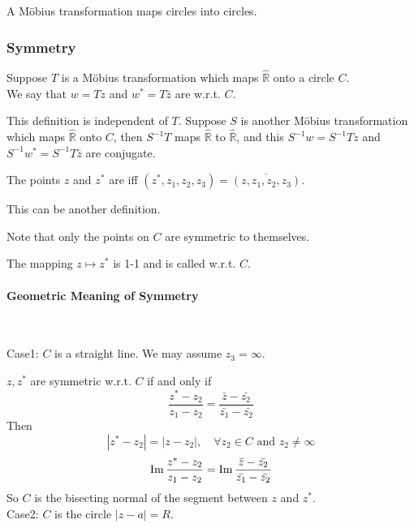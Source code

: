 
\begin{theorem}
    A M{\"o}bius transformation maps circles into circles.
\end{theorem}
\subsubsection{Symmetry}
Suppose  $ T  $ is a M{\"o}bius transformation which maps  $ \hat{\mathbb{R}}  $ onto a circle  $ C $. \\
We say that  $ w=Tz  $ and  $ w^*=T\bar{z} $ are  w.r.t.  $ C $.
\begin{remark}
    This definition is independent of  $ T $. Suppose  $ S  $ is another M{\"o}bius transformation which maps  $ \hat{\mathbb{R}} $ onto  $ C $, then  $ S^{-1}T $ maps  $ \hat{\mathbb{R}} $ to  $ \hat{\mathbb{R}} $, and this  $ S^{-1}w=S^{-1}Tz $ and  $ S^{-1}w^*=S^{-1}T\bar{z} $ are conjugate.       
\end{remark}  
The points  $ z  $ and  $ z^* $ are  iff  $ (z^*,z_1,z_2,z_3)=\overline{(z,z_1,z_2,z_3)} $.

This can be another definition. 

Note that only the points on  $ C  $ are symmetric to themselves.

The mapping  $ z\mapsto z^* $ is 1-1 and is called  w.r.t. $ C $.

\paragraph{Geometric Meaning of Symmetry} 
\,

Case1:  $ C  $ is a straight line. We may assume  $ z_3=\infty $. 

$ z,z^* $ are symmetric w.r.t.  $ C $ if and only if 
\[\frac{z^*-z_2}{z_1-z_2}=\frac{\bar{z}-\bar{z_2}}{\bar{z_1}-\bar{z_2}}\]
Then 
\[|z^*-z_2|=|z-z_2|,\quad \forall z_2\in C\text{ and }z_2\neq\infty\]
\[\operatorname{Im}\frac{z^*-z_2}{z_1-z_2}=\operatorname{Im}\frac{\bar{z}-\bar{z_2}}{\bar{z_1}-\bar{z_2}}\]   
So  $ C  $ is the bisecting normal of the segment between  $ z  $ and  $ z^
 * $.\\
Case2: $ C  $ is the circle  $ |z-a|=R $.

